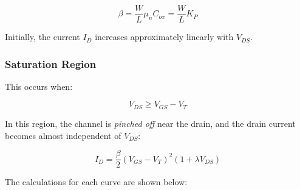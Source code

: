 \documentclass[a4paper,12pt]{article}
\begin{document}
\[
\beta = \frac{W}{L} \mu_n C_{ox} = \frac{W}{L} K_P
\]

Initially, the current $I_D$ increases approximately linearly with $V_{DS}$.

\subsubsection*{Saturation Region}
This occurs when:

\begin{equation}
    V_{DS} \geq V_{GS} - V_T
\end{equation}

In this region, the channel is \emph{pinched off} near the drain, and the drain current becomes almost independent of $V_{DS}$:

\begin{equation}
    I_D = \frac{\beta}{2}(V_{GS} - V_T)^2(1 + \lambda V_{DS})
\end{equation}

The calculations for each curve are shown below:
\end{document}
